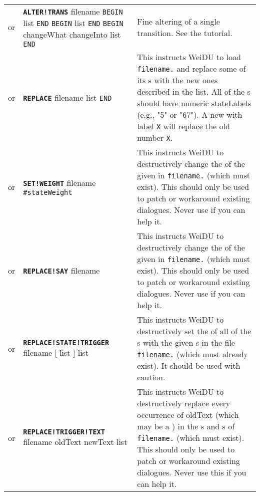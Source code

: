 \documentclass{article}
\def\ttref#1{\ahrefloc{#1}{\tt #1}}
\def\DEFINE#1{{\tt \bf #1}\label{#1}\index{#1}}
\def\DEFSYN#1{{\tt \bf #1}\index{#1}}
\def\t#1{{\tt #1}}
\def\Slist{{\color{red} list }}
\def\Ob{{\color{red} [ }}
\def\Oe{{\color{red} ] }}
\begin{document}
\begin{tabular}{cp{10in}|p{10in}}
  \\

  or & \DEFSYN{ALTER!TRANS} filename
    \t{BEGIN} \ttref{stateNumber} \Slist \t{END}
    \t{BEGIN} \ttref{transNumber} \Slist \t{END}
    \t{BEGIN} changeWhat changeInto \Slist \t{END} &
  Fine altering of a single transition. See the \ttref{ALTER!TRANS} tutorial.

  \\

  or & \DEFINE{REPLACE} filename \ttref{state} \Slist \t{END} &
  This instructs WeiDU to load \t{filename.}\ttref{DLG} and replace some of its
  \ttref{state}s with the new ones described in the \ttref{state} list.
  All of the \ttref{state}s should have numeric stateLabels (e.g., "5" or
  "67"). A new \ttref{state} with label \t{X} will replace the old
  \ttref{state} number \t{X}.  \\

  or & \DEFINE{SET!WEIGHT} filename \ttref{stateLabel} \tt{\#stateWeight} &
  This instructs WeiDU to destructively change the \ttref{WEIGHT} of the
  given \ttref{state} in \t{filename.}\ttref{DLG} (which must exist). This should only
  be used to patch or workaround existing dialogues. Never use
  \ttref{SET!WEIGHT} if you can help it.  \\

  or & \DEFINE{REPLACE!SAY} filename \ttref{stateLabel} \ttref{sayString} &
  This instructs WeiDU to destructively change the \ttref{sayString} of the
  given \ttref{state} in \t{filename.}\ttref{DLG} (which must exist). This should only
  be used to patch or workaround existing dialogues. Never use
  \ttref{REPLACE!SAY} if you can help it. \\

  or & \DEFINE{REPLACE!STATE!TRIGGER} filename \ttref{stateNumber}
    \ttref{stateTriggerString} \Ob \ttref{stateNumber} \Slist \Oe
	\ttref{dActionWhen} \Slist &
  This instructs WeiDU to destructively set the
  \ttref{stateTriggerString} of all of the \ttref{state}s with the given
  \ttref{stateNumber}s in the file \t{filename.}\ttref{DLG} (which must already
  exist). It should be used with caution. \\

  or & \DEFINE{REPLACE!TRIGGER!TEXT} filename oldText newText
 \ttref{dActionWhen} \Slist  &
  This instructs WeiDU to destructively replace every occurrence of oldText
  (which may be a \ttref{regexp}) in the \ttref{stateTriggerString}s and
  \ttref{transTriggerString}s of \t{filename.}\ttref{DLG} (which must exist).
  This should only be used to patch or workaround existing dialogues. Never
  use this if you can help it. \\


\end{tabular}
\end{document}
